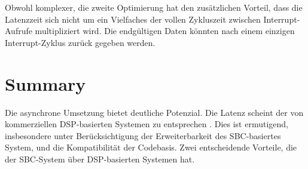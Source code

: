 Obwohl komplexer, die zweite Optimierung hat den zusätzlichen Vorteil, dass die Latenzzeit sich nicht um ein Vielfaches der vollen Zykluszeit zwischen Interrupt-Aufrufe multipliziert wird. Die endgültigen Daten könnten nach einem einzigen Interrupt-Zyklus zurück gegeben werden.

\section{Summary}

Die asynchrone Umsetzung bietet deutliche Potenzial. Die Latenz scheint der von kommerziellen DSP-basierten Systemen zu entsprechen\cite{UAD2-review} . Dies ist ermutigend, insbesondere unter Berücksichtigung der Erweiterbarkeit des SBC-basiertes System, und die Kompatibilität der Codebasis. Zwei entscheidende Vorteile, die der SBC-System über DSP-basierten Systemen hat.


